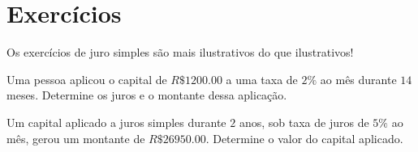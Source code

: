 \documentclass{book}
\theoremstyle{definition}
\theoremstyle{remark}
\theoremstyle{plain}
\theoremstyle{plain}
\theoremstyle{plain}
\theoremstyle{plain}
\begin{document}
    \section{Exercícios}
    Os exercícios de juro simples são mais ilustrativos do que ilustrativos!
    \begin{Exercise}[origin={exercicios.brasilescola.uol.com.br/}]
        Uma pessoa aplicou o capital de $R\$ \num{1200.00}$ a uma taxa de $2\%$ ao mês durante $14$ meses. 
        Determine os juros e o montante dessa aplicação.
    \end{Exercise}
    \begin{Exercise}[origin={exercicios.brasilescola.uol.com.br/}]
        Um capital aplicado a juros simples durante $2$ anos, sob taxa de juros de $5\%$ ao mês, 
        gerou um montante de $R\$ \num{26950.00}$. Determine o valor do capital aplicado. 
    \end{Exercise}

\end{document}
